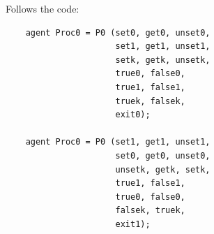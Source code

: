\documentclass[10pt,a4paper]{article}
\begin{document}
        Follows the code:
        \begin{verbatim}
    agent Proc0 = P0 (set0, get0, unset0,
                      set1, get1, unset1,
                      setk, getk, unsetk,
                      true0, false0,
                      true1, false1,
                      truek, falsek,
                      exit0);

    agent Proc0 = P0 (set1, get1, unset1,
                      set0, get0, unset0,
                      unsetk, getk, setk,
                      true1, false1,
                      true0, false0,
                      falsek, truek,
                      exit1);
        \end{verbatim}
\end{document}
